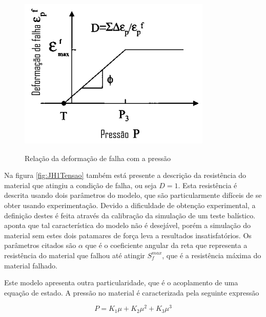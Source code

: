 \begin{figure}
    \centering  
    \caption{Relação da deformação de falha com a pressão}
    \includegraphics[width = 0.7\linewidth]{images/deffalhapressao.png} 
    \label{fig:deffalhapressJH1}
\end{figure}

Na figura \ref{fig:JH1Tensao} também está presente a descrição da resistência do material que atingiu a condição de falha, ou seja $ D = 1 $. Esta resistência é descrita usando dois parâmetros do modelo, que são particularmente difíceis de se obter usando experimentação. Devido a dificuldade de obtenção experimental, a definição destes é feita através da calibração da simulação de um teste balístico. \cite{holmquist_johnson_2002} aponta que tal característica do modelo não é desejável, porém a simulação do material sem estes dois patamares de força leva a resultados insatisfatórios.
Os parâmetros citados são $ \alpha $ que é o coeficiente angular da reta que representa a resistência do material que falhou até atingir $ S^{max}_f $, que é a resistência máxima do material falhado. \par

Este modelo apresenta outra particularidade, que é o acoplamento de uma  equação de estado. A pressão no material é caracterizada pela seguinte expressão 

\begin{equation} \label{eq:JHEOS}
    P = K_1 \mu + K_2 \mu^2 + K_3 \mu^3
\end{equation}


